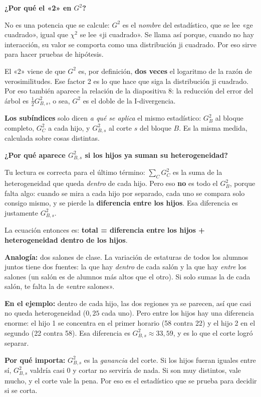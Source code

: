 \documentclass[11pt,a4paper]{article}
\newcommand{\cajainicio}[3]{\par\medskip\noindent
  \begin{lrbox}{\cajabox}\begin{minipage}{\dimexpr\linewidth-2\fboxsep-2\fboxrule\relax}%
  \textbf{\color{#1}#3}\par\smallskip}
\newcommand{\cajafin}[2]{\end{minipage}\end{lrbox}\fcolorbox{#1}{#2}{\usebox{\cajabox}}\par\medskip}
\newenvironment{nota}[1]{\cajainicio{acc}{acc!7}{#1}}{\cajafin{acc}{acc!7}}
\begin{document}
\begin{nota}{¿Por qué el «2» en $G^2$?}
No es una potencia que se calcule: $G^2$ es el \emph{nombre} del estadístico, que se lee «ge cuadrado», igual que $\chi^2$ se lee «ji cuadrado». Se llama así porque, cuando no hay interacción, su valor se comporta como una distribución ji cuadrado. Por eso sirve para hacer pruebas de hipótesis.

El «2» viene de que $G^2$ es, por definición, \textbf{dos veces} el logaritmo de la razón de verosimilitudes. Ese factor 2 es lo que hace que siga la distribución ji cuadrado. Por eso también aparece la relación de la diapositiva 8: la reducción del error del árbol es $\tfrac12 G^2_{B,s}$, o sea, $G^2$ es el doble de la I-divergencia.

\textbf{Los subíndices} solo dicen \emph{a qué se aplica} el mismo estadístico: $G^2_B$ al bloque completo, $G^2_C$ a cada hijo, y $G^2_{B,s}$ al corte $s$ del bloque $B$. Es la misma medida, calculada sobre cosas distintas.
\end{nota}

\begin{nota}{¿Por qué aparece $G^2_{B,s}$ si los hijos ya suman su heterogeneidad?}
Tu lectura es correcta para el último término: $\sum_C G^2_C$ es la suma de la heterogeneidad que queda \emph{dentro} de cada hijo. Pero eso \textbf{no} es todo el $G^2_B$, porque falta algo: cuando se mira a cada hijo por separado, cada uno se compara solo consigo mismo, y se pierde la \textbf{diferencia entre los hijos}. Esa diferencia es justamente $G^2_{B,s}$.

La ecuación entonces es: \textbf{total = diferencia entre los hijos + heterogeneidad dentro de los hijos}.

\textbf{Analogía:} dos salones de clase. La variación de estaturas de todos los alumnos juntos tiene dos fuentes: la que hay \emph{dentro} de cada salón y la que hay \emph{entre} los salones (un salón es de alumnos más altos que el otro). Si solo sumas la de cada salón, te falta la de «entre salones».

\textbf{En el ejemplo:} dentro de cada hijo, las dos regiones ya se parecen, así que casi no queda heterogeneidad ($0{,}25$ cada uno). Pero entre los hijos hay una diferencia enorme: el hijo 1 se concentra en el primer horario (58 contra 22) y el hijo 2 en el segundo (22 contra 58). Esa diferencia es $G^2_{B,s}\approx 33{,}59$, y es lo que el corte logró separar.

\textbf{Por qué importa:} $G^2_{B,s}$ es la \emph{ganancia} del corte. Si los hijos fueran iguales entre sí, $G^2_{B,s}$ valdría casi 0 y cortar no serviría de nada. Si son muy distintos, vale mucho, y el corte vale la pena. Por eso es el estadístico que se prueba para decidir si se corta.
\end{nota}
\end{document}
